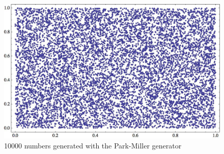 \documentclass[12pt]{article}
\numberwithin{equation}{section}
\numberwithin{table}{section}
\begin{document}
\begin{figure}
\caption{10000 numbers generated with the Park-Miller generator}
\includegraphics[width=15cm]{pm2.jpg}
\end{figure}
\end{document}
